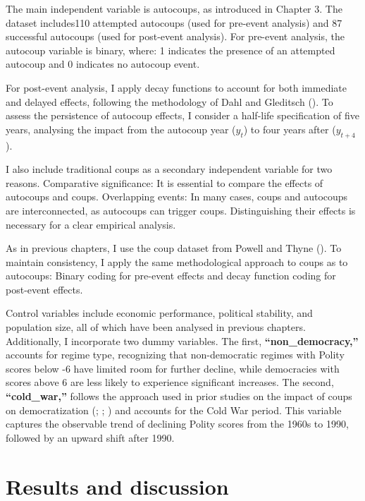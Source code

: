 \documentclass[
  12pt,
]{report}
\begin{document}
The main independent variable is autocoups, as introduced in Chapter 3.
The dataset includes110 attempted autocoups (used for pre-event
analysis) and 87 successful autocoups (used for post-event analysis).
For pre-event analysis, the autocoup variable is binary, where: 1
indicates the presence of an attempted autocoup and 0 indicates no
autocoup event.

For post-event analysis, I apply decay functions to account for both
immediate and delayed effects, following the methodology of Dahl and
Gleditsch (). To assess the persistence of
autocoup effects, I consider a half-life specification of five years,
analysing the impact from the autocoup year (\(y_t\)) to four years
after (\(y_{t+4}\)).

I also include traditional coups as a secondary independent variable for
two reasons. Comparative significance: It is essential to compare the
effects of autocoups and coups. Overlapping events: In many cases, coups
and autocoups are interconnected, as autocoups can trigger coups.
Distinguishing their effects is necessary for a clear empirical
analysis.

As in previous chapters, I use the coup dataset from Powell and Thyne
(). To maintain consistency, I apply the
same methodological approach to coups as to autocoups: Binary coding for
pre-event effects and decay function coding for post-event effects.

Control variables include economic performance, political stability, and
population size, all of which have been analysed in previous chapters.
Additionally, I incorporate two dummy variables. The first,
\textbf{``\textbf{non\_democracy},''} accounts for regime type,
recognizing that non-democratic regimes with Polity scores below -6 have
limited room for further decline, while democracies with scores above 6
are less likely to experience significant increases. The second,
\textbf{``\textbf{cold\_war},''} follows the approach used in prior
studies on the impact of coups on democratization
(;
;
) and accounts for the
Cold War period. This variable captures the observable trend of
declining Polity scores from the 1960s to 1990, followed by an upward
shift after 1990.

\section{Results and discussion}\label{results-and-discussion-2}
\end{document}
